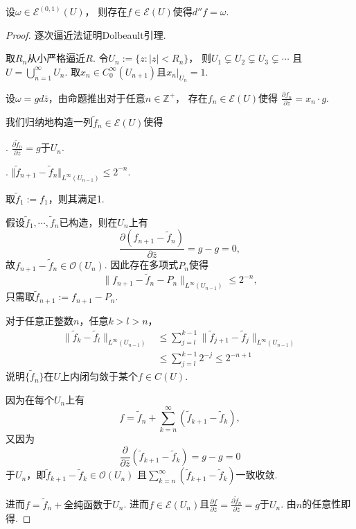 		
\begin{lemma}
	设$\omega\in \mathcal{E}^{(0,1)}(U)$，
    则存在$f\in \mathcal{E}(U)$使得$d''f=\omega$.
\end{lemma}

\begin{proof} 逐次逼近法证明Dolbeault引理.\par
	取$R_n$从小严格逼近$R$. 令$U_n:=\{z:|z|<R_n\}$，
    则$U_1\subsetneq U_2\subsetneq U_3\subsetneq \cdots$
    且$U=\bigcup\limits_{n=1}^\infty U_n$. 
    取$x_n\in C^\infty_0(U_{n+1})$且$x_n|_{U_n}=1$.

	设$\omega=gd\bar{z}$，由命题推出对于任意$n\in \mathbb{Z}^+$，
    存在$f_n\in \mathcal{E}(U)$使得
    $\frac{\partial f_n}{\partial \bar{z}}=x_n \cdot g$.

	我们归纳地构造一列$\tilde{f}_n\in \mathcal{E}(U)$使得

	. $\frac{\partial \tilde{f}_n}{\partial \bar{z}}=g$于$U_n$.

	. $\Vert \tilde{f}_{n+1}-\tilde{f}_n\Vert_{L^\infty(U_{n-1})}\leq 2^{-n}$.

	取$\tilde{f}_1:=f_1$，则其满足1.

	假设$\tilde{f}_1, \cdots, \tilde{f}_n$已构造，则在$U_n$上有
    \[\frac{\partial (f_{n+1}-\tilde{f}_n)}{\partial \bar{z}}=g-g=0,\]
    故$f_{n+1}-\tilde{f}_n\in \mathcal{O}(U_n)$. 
    因此存在多项式$P_n$使得
    \[\|f_{n+1}-\tilde{f}_n-P_n\|_{L^\infty(U_{n-1})} \leq 2^{-n},\]
    只需取$\tilde{f}_{n+1}:=f_{n+1}-P_n$.

	对于任意正整数$n$，任意$k>l>n$，
	\begin{align*}
		\|\tilde{f}_k-\tilde{f}_l\|_{L^\infty(U_{n-1})}
		&\leq \sum_{j=l}^{k-1} \|\tilde{f}_{j+1}-\tilde{f}_j\|_{L^\infty(U_{n-1})}\\
		&\leq \sum_{j=l}^{k-1} 2^{-j}\leq 2^{-n+1}
	\end{align*}
	说明$\{ \tilde{f}_n\}$在$U$上内闭匀敛于某个$f\in C(U)$.
    
    因为在每个$U_n$上有
    \[f=\tilde{f}_n+\sum_{k=n}^\infty (\tilde{f}_{k+1}-\tilde{f}_k),\]
    又因为\[\frac{\partial }{\partial \bar{z}} (\tilde{f}_{k+1}-\tilde{f}_k)=g-g=0\]
    于$U_n$，即$\tilde{f}_{k+1}-\tilde{f}_k\in \mathcal{O}(U_n)$
    且$\sum\limits_{k=n}^\infty(\tilde{f}_{k+1}-\tilde{f}_k)$一致收敛.

	进而$f=\tilde{f}_n+\text{全纯函数}$于$U_n$. 
    进而$f\in \mathcal{E}(U_n)$且$\frac{\partial f}{\partial \bar{z}}
    =\frac{\partial \tilde{f}_n}{\partial \bar{z}}=g$于$U_n$. 
    由$n$的任意性即得.
\end{proof}

